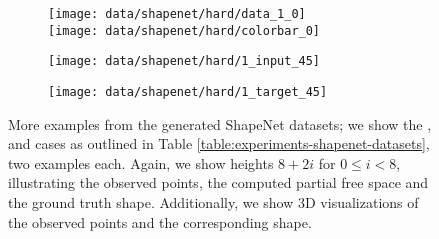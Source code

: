 \begin{figure}[h]
\begin{subfigure}[t]{0.425\textwidth}
    \texttt{[image: data/shapenet/hard/data\_1\_0]}\\
    \hspace*{-0.25cm}\texttt{[image: data/shapenet/hard/colorbar\_0]}
  \end{subfigure}
  \begin{subfigure}[t]{0.2\textwidth}
    \vspace{0px}
    \texttt{[image: data/shapenet/hard/1\_input\_45]}
  \end{subfigure}
  \begin{subfigure}[t]{0.2\textwidth}
    \vspace{0px}
    \texttt{[image: data/shapenet/hard/1\_target\_45]}
  \end{subfigure}
  
  \caption{More examples from the generated ShapeNet datasets; we show the \easy,
  \moderate and \hard cases as outlined in Table \ref{table:experiments-shapenet-datasets},
  two examples each. Again, we show heights $8 + 2i$ for $0 \leq i < 8$, illustrating the
  observed points, the computed partial free space and the ground truth shape.
  Additionally, we show 3D visualizations of the observed points and the corresponding
  shape.}
  \label{fig:appendix-data-shapenet}
\end{figure}


